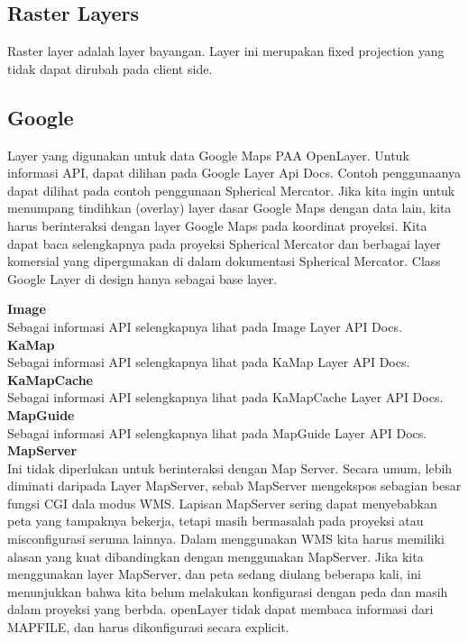\subsection {Raster Layers}
Raster layer adalah layer bayangan. Layer ini merupakan fixed projection yang tidak dapat dirubah pada client side.

\subsection {Google}
Layer yang digunakan untuk data Google Maps PAA OpenLayer. Untuk informasi API, dapat dilihan pada Google Layer Api Docs. 
Contoh penggunaanya dapat dilihat pada contoh penggunaan Spherical Mercator.
Jika kita ingin untuk menumpang tindihkan (overlay) layer dasar Google Maps dengan data lain, kita harus berinteraksi dengan layer Google Maps pada koordinat proyeksi.
Kita dapat baca selengkapnya pada proyeksi Spherical Mercator dan berbagai layer komersial yang dipergunakan di dalam dokumentasi Spherical Mercator.
Class Google Layer di design hanya sebagai base layer.

\textbf{Image} \\
Sebagai informasi API selengkapnya lihat pada Image Layer API Docs.\\
\textbf{KaMap} \\
Sebagai informasi API selengkapnya lihat pada KaMap Layer API Docs.\\
\textbf{KaMapCache} \\
Sebagai informasi API selengkapnya lihat pada KaMapCache Layer API Docs.\\
\textbf{MapGuide} \\
Sebagai informasi API selengkapnya lihat pada MapGuide Layer API Docs.\\
\textbf{MapServer} \\
Ini tidak diperlukan untuk berinteraksi dengan Map Server. Secara umum, lebih diminati daripada Layer MapServer, sebab MapServer mengekspos sebagian besar fungsi CGI dala modus WMS.
Lapisan MapServer sering dapat menyebabkan peta yang tampaknya bekerja, tetapi masih bermasalah pada proyeksi atau misconfigurasi seruma lainnya.
Dalam menggunakan WMS kita harus memiliki alasan yang kuat dibandingkan dengan menggunakan MapServer.
Jika kita menggunakan layer MapServer, dan peta sedang diulang beberapa kali, ini menunjukkan bahwa kita belum melakukan konfigurasi dengan peda dan masih dalam proyeksi yang berbda.
openLayer tidak dapat membaca informasi dari MAPFILE, dan harus dikonfigurasi secara explicit.\\

